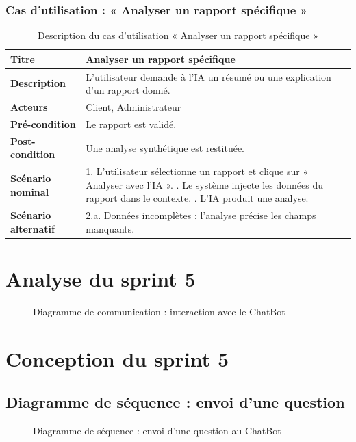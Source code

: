 \subsubsection{Cas d'utilisation : « Analyser un rapport spécifique »}
\begin{table}[h!]
\centering
\renewcommand{\arraystretch}{1.3}
\begin{tabularx}{\textwidth}{|l|X|}
\hline
\textbf{Titre} & Analyser un rapport spécifique \\ \hline
\textbf{Description} & L'utilisateur demande à l'IA un résumé ou une explication
d'un rapport donné. \\ \hline
\textbf{Acteurs} & Client, Administrateur \\ \hline
\textbf{Pré-condition} & Le rapport est validé. \\ \hline
\textbf{Post-condition} & Une analyse synthétique est restituée. \\ \hline
\textbf{Scénario nominal} &
1. L'utilisateur sélectionne un rapport et clique sur « Analyser avec l'IA ». \newline
2. Le système injecte les données du rapport dans le contexte. \newline
3. L'IA produit une analyse. \\ \hline
\textbf{Scénario alternatif} &
2.a. Données incomplètes : l'analyse précise les champs manquants. \\ \hline
\end{tabularx}
\caption{Description du cas d'utilisation « Analyser un rapport spécifique »}
\end{table}

\section{Analyse du sprint 5}
\begin{figure}[h!]
\centering
{}
\caption{Diagramme de communication : interaction avec le ChatBot}
\end{figure}

\section{Conception du sprint 5}

\subsection{Diagramme de séquence : envoi d'une question}
\begin{figure}[h!]
\centering
{}
\caption{Diagramme de séquence : envoi d'une question au ChatBot}
\end{figure}

